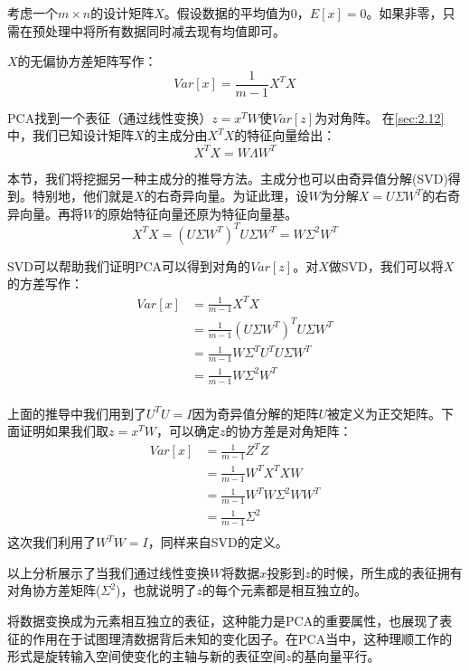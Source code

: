 考虑一个$m\times n$的设计矩阵$X$。假设数据的平均值为0，$E[x]=0$。如果非零，只需在预处理中将所有数据同时减去现有均值即可。

$X$的无偏协方差矩阵写作：
\begin{equation}
	Var[x] = \frac{1}{m-1}X^{T}X
   \label{form:5.85}
\end{equation}

PCA找到一个表征（通过线性变换）$z=x^{T}W$使$Var[z]$为对角阵。
在\ref{sec:2.12}中，我们已知设计矩阵$X$的主成分由$X^{T}X$的特征向量给出：
\begin{equation}
	X^{T}X = W\Lambda W^{T}
   \label{form:5.86}
\end{equation}

本节，我们将挖掘另一种主成分的推导方法。主成分也可以由奇异值分解(SVD)得到。特别地，他们就是$X$的右奇异向量。为证此理，设$W$为分解$X=U\Sigma W^{T}$的右奇异向量。再将$W$的原始特征向量还原为特征向量基。
\begin{equation}
	X^{T}X = (U\Sigma W^{T})^{T} U\Sigma W^{T} = W\Sigma^{2}W^{T}
   \label{form:5.87}
\end{equation}

SVD可以帮助我们证明PCA可以得到对角的$Var[z]$。对$X$做SVD，我们可以将$X$的方差写作：
\begin{align}
	Var[x] & = \frac{1}{m-1}X^{T}X\\
	&= \frac{1}{m-1}(U\Sigma W^T)^T U\Sigma W^T\\
	&=\frac{1}{m-1}W\Sigma ^T U^T U \Sigma W^T\\
	&=\frac{1}{m-1}W \Sigma ^2 W^T\\
\end{align}

上面的推导中我们用到了$U^T U = I$因为奇异值分解的矩阵$U$被定义为正交矩阵。下面证明如果我们取$z=x^T W$，可以确定$z$的协方差是对角矩阵：
\begin{align}
	Var[x] & = \frac{1}{m-1}Z^{T}Z\\
	&= \frac{1}{m-1}W^T X^T X W\\
	&=\frac{1}{m-1}W^T W \Sigma ^2 W W^T\\
	&=\frac{1}{m-1}\Sigma ^2\\
\end{align}
这次我们利用了$W^T W = I$，同样来自SVD的定义。

以上分析展示了当我们通过线性变换$W$将数据$x$投影到$z$的时候，所生成的表征拥有对角协方差矩阵($\Sigma ^2$)，也就说明了$z$的每个元素都是相互独立的。

将数据变换成为元素相互独立的表征，这种能力是PCA的重要属性，也展现了表征的作用在于试图理清数据背后未知的变化因子。在PCA当中，这种理顺工作的形式是旋转输入空间使变化的主轴与新的表征空间$z$的基向量平行。

